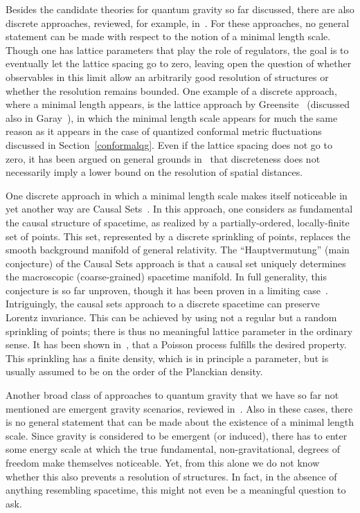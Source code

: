 \documentclass{article}
\begin{document}
Besides the candidate theories for quantum gravity so far discussed, there are also 
discrete approaches, reviewed, for example, in~\cite{Loll:1998aj}. 
For these approaches, no general statement can be made with respect to the notion of a minimal length scale. Though one has 
lattice parameters that play the role of regulators, the goal is to eventually let the lattice spacing go 
to zero, leaving open the question of whether observables in this limit allow an arbitrarily good resolution 
of structures or whether the resolution remains bounded. One example of a discrete approach, where 
a minimal length appears, is the lattice approach by Greensite~\cite{Greensite:1990jm} (discussed also in Garay~\cite{Garay:1994en}), in which the 
minimal length scale appears for much the same reason as it appears in the case of 
quantized conformal metric fluctuations discussed in Section~\ref{conformalqg}. Even if the lattice spacing does not go to zero,
it has been argued on general grounds in~\cite{Bojowald:2011jd} that discreteness does not
necessarily imply a lower bound on the resolution of spatial distances. 

One discrete approach in which a minimal length scale makes itself noticeable in yet another
way are Causal Sets~\cite{Sorkin:2003bx}. In this approach, one considers as fundamental 
the causal structure of spacetime, as realized by a partially-ordered, locally-finite set of points. 
This set, represented by a discrete sprinkling of points, replaces the smooth background manifold of 
general relativity. The ``Hauptvermutung'' (main conjecture) of the Causal Sets approach is that 
a causal set uniquely determines the macroscopic (coarse-grained) spacetime manifold. In
full generality, this conjecture is so far unproven, though it has been proven in
a limiting case~\cite{Bombelli:1989mu}. Intriguingly, the causal sets approach to a discrete spacetime 
can preserve Lorentz invariance.  This can be achieved by using not a regular but a random sprinkling 
of points; there is thus no meaningful lattice parameter in the ordinary sense. It has been shown in~\cite{Bombelli:2006nm}, 
that a Poisson process fulfills the desired property. This sprinkling has a finite density, 
which is in principle a parameter, but is usually assumed to be on the order of the Planckian density.

Another broad class of approaches to quantum gravity that we have so far not mentioned  
are emergent gravity scenarios, reviewed in~\cite{Barcelo:2005fc,Sindoni:2011ej}. Also in these
cases, there is no general statement that can be made about the existence of a minimal length scale. 
Since gravity is considered to
be emergent (or induced), there has to enter some energy scale at which the true fundamental,
non-gravitational, degrees of freedom make themselves noticeable. Yet, from this alone we do not know whether this 
also prevents a resolution of structures. In fact, in the absence of
anything resembling spacetime, this might not even be a meaningful question to ask. 
\end{document}
